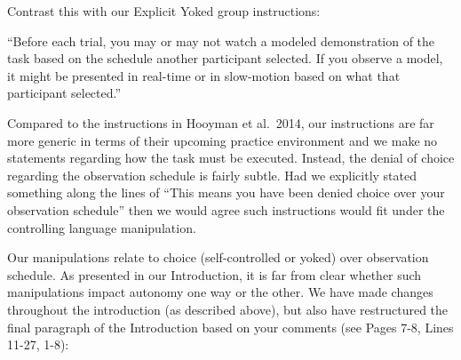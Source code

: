 \documentclass[final]{article}
\begin{document}
Contrast this with our Explicit Yoked group instructions:

``Before each trial, you may or may not watch a modeled demonstration of the task based on the schedule another participant selected. If you observe a model, it might be presented in real-time or in slow-motion based on what that participant selected.''

Compared to the instructions in Hooyman et al.~2014, our instructions are far more generic in terms of their upcoming practice environment and we make no statements regarding how the task must be executed. Instead, the denial of choice regarding the observation schedule is fairly subtle. Had we explicitly stated something along the lines of ``This means you have been denied choice over your observation schedule'' then we would agree such instructions would fit under the controlling language manipulation.


Our manipulations relate to choice (self-controlled or yoked) over observation schedule. As presented in our Introduction, it is far from clear whether such manipulations impact autonomy one way or the other. We have made changes throughout the introduction (as described above), but also have restructured the final paragraph of the Introduction based on your comments (see Pages 7-8, Lines 11-27, 1-8):
\end{document}
